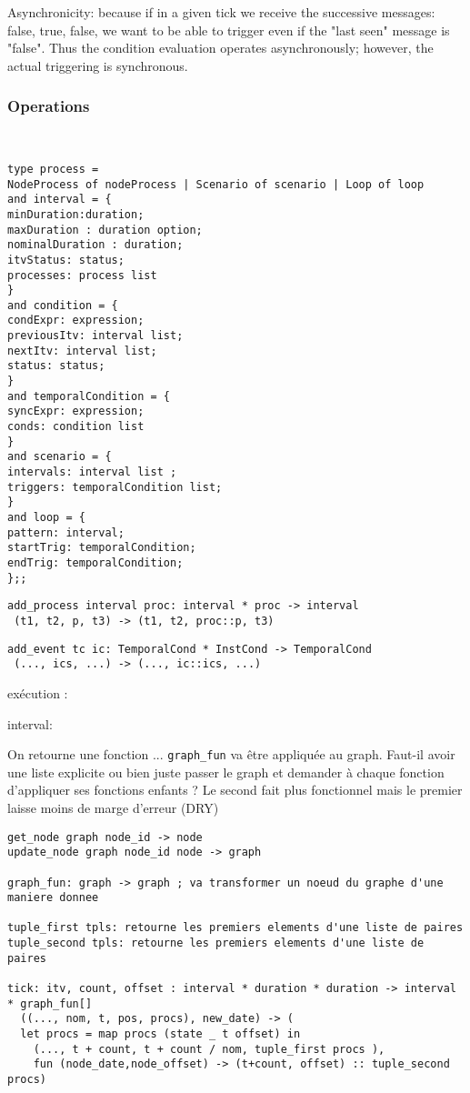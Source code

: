 \documentclass[applsci,article,submit,moreauthors,pdftex,10pt,a4paper]{mdpi}
\begin{document}
Asynchronicity: because if in a given tick we receive the successive messages: false, true, false, we want to be able to trigger even if the "last seen" message is "false".
Thus the condition evaluation operates asynchronously; however, the actual triggering is synchronous.


\subsubsection{Operations}
\begin{lstlisting}


type process = 
NodeProcess of nodeProcess | Scenario of scenario | Loop of loop
and interval = {
minDuration:duration;
maxDuration : duration option;
nominalDuration : duration;
itvStatus: status;
processes: process list
}
and condition = { 
condExpr: expression; 
previousItv: interval list; 
nextItv: interval list; 
status: status; 
}
and temporalCondition = { 
syncExpr: expression; 
conds: condition list
}
and scenario = { 
intervals: interval list ; 
triggers: temporalCondition list; 
}
and loop = { 
pattern: interval; 
startTrig: temporalCondition;
endTrig: temporalCondition; 
};;

\end{lstlisting}
\begin{lstlisting}
add_process interval proc: interval * proc -> interval
 (t1, t2, p, t3) -> (t1, t2, proc::p, t3)
\end{lstlisting}

\begin{lstlisting}
add_event tc ic: TemporalCond * InstCond -> TemporalCond
 (..., ics, ...) -> (..., ic::ics, ...)
\end{lstlisting}

exécution : 

interval: 

On retourne une fonction ... \lstinline|graph_fun| va être appliquée au graph. Faut-il avoir une liste explicite ou bien juste passer le graph et demander à chaque fonction d'appliquer ses fonctions enfants ? Le second fait plus fonctionnel mais le premier laisse moins de marge d'erreur (DRY)
\begin{lstlisting}
get_node graph node_id -> node
update_node graph node_id node -> graph

graph_fun: graph -> graph ; va transformer un noeud du graphe d'une maniere donnee

tuple_first tpls: retourne les premiers elements d'une liste de paires
tuple_second tpls: retourne les premiers elements d'une liste de paires

tick: itv, count, offset : interval * duration * duration -> interval * graph_fun[]
  ((..., nom, t, pos, procs), new_date) -> (
  let procs = map procs (state _ t offset) in 
    (..., t + count, t + count / nom, tuple_first procs ),  
    fun (node_date,node_offset) -> (t+count, offset) :: tuple_second procs)

\end{lstlisting}
\end{document}
